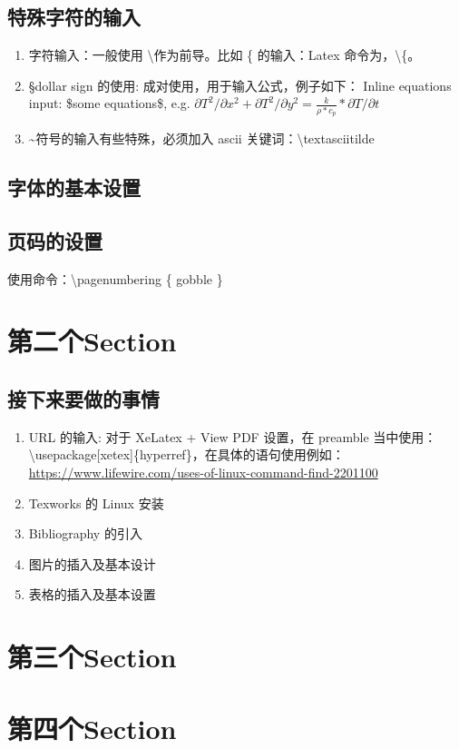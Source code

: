 \documentclass[UTF8,fancyhdr,a4paper]{ctexart}
\begin{document}
\subsection{特殊字符的输入}

\begin{enumerate}
\item
字符输入：一般使用 \textbackslash \space 作为前导。比如 \{ 的输入：Latex 命令为，\textbackslash \{。

\item 
\S \space dollar sign 的使用: 成对使用，用于输入公式，例子如下：
Inline equations input: \$some equations\$, e.g. $\partial T^2/\partial x^2 + \partial T^2/\partial y^2 =\frac{k}{\rho*c_p}*{\partial T/\partial t} $

\item
\textasciitilde 符号的输入有些特殊，必须加入 ascii 关键词：\textbackslash textasciitilde

\end{enumerate}

\subsection{字体的基本设置}



\subsection{页码的设置}
使用命令：\textbackslash pagenumbering \{ gobble \}

\newpage
\section{第二个Section}

\subsection{接下来要做的事情}
\begin{enumerate}
\item
URL 的输入: 对于 XeLatex + View PDF 设置，在 preamble 当中使用：\\
\textbackslash usepackage[xetex]\{hyperref\}，在具体的语句使用例如：\\ \url{https://www.lifewire.com/uses-of-linux-command-find-2201100}
\item
Texworks 的 Linux 安装
\item
Bibliography 的引入
\item
图片的插入及基本设计
\item
表格的插入及基本设置



\end{enumerate}

\newpage
\section{第三个Section}

\newpage
\section{第四个Section}
\end{document}
